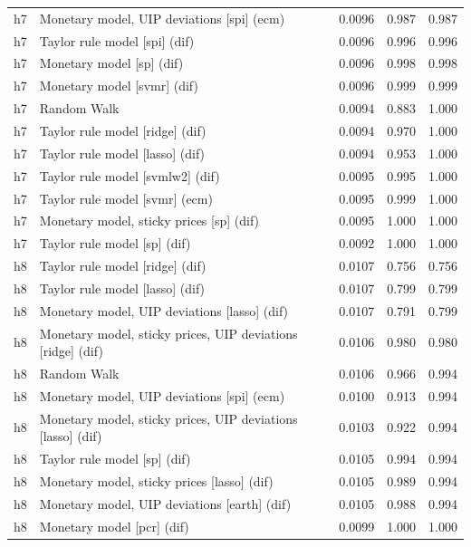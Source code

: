 \begin{ThreePartTable}
\begin{longtable}[t]{cp{5.5cm}ccc}
\addlinespace
h7 & \raggedright Monetary model, UIP deviations [spi] (ecm) & 0.0096 & 0.987 & 0.987\\
h7 & \raggedright Taylor rule model [spi] (dif) & 0.0096 & 0.996 & 0.996\\
h7 & \raggedright Monetary model [sp] (dif) & 0.0096 & 0.998 & 0.998\\
h7 & \raggedright Monetary model [svmr] (dif) & 0.0096 & 0.999 & 0.999\\
h7 & \raggedright Random Walk & 0.0094 & 0.883 & 1.000\\
h7 & \raggedright Taylor rule model [ridge] (dif) & 0.0094 & 0.970 & 1.000\\
h7 & \raggedright Taylor rule model [lasso] (dif) & 0.0094 & 0.953 & 1.000\\
h7 & \raggedright Taylor rule model [svmlw2] (dif) & 0.0095 & 0.995 & 1.000\\
h7 & \raggedright Taylor rule model [svmr] (ecm) & 0.0095 & 0.999 & 1.000\\
h7 & \raggedright Monetary model, sticky prices [sp] (dif) & 0.0095 & 1.000 & 1.000\\
h7 & \raggedright Taylor rule model [sp] (dif) & 0.0092 & 1.000 & 1.000\\
\addlinespace
h8 & \raggedright Taylor rule model [ridge] (dif) & 0.0107 & 0.756 & 0.756\\
h8 & \raggedright Taylor rule model [lasso] (dif) & 0.0107 & 0.799 & 0.799\\
h8 & \raggedright Monetary model, UIP deviations [lasso] (dif) & 0.0107 & 0.791 & 0.799\\
h8 & \raggedright Monetary model, sticky prices, UIP deviations [ridge] (dif) & 0.0106 & 0.980 & 0.980\\
h8 & \raggedright Random Walk & 0.0106 & 0.966 & 0.994\\
h8 & \raggedright Monetary model, UIP deviations [spi] (ecm) & 0.0100 & 0.913 & 0.994\\
h8 & \raggedright Monetary model, sticky prices, UIP deviations [lasso] (dif) & 0.0103 & 0.922 & 0.994\\
h8 & \raggedright Taylor rule model [sp] (dif) & 0.0105 & 0.994 & 0.994\\
h8 & \raggedright Monetary model, sticky prices [lasso] (dif) & 0.0105 & 0.989 & 0.994\\
h8 & \raggedright Monetary model, UIP deviations [earth] (dif) & 0.0105 & 0.988 & 0.994\\
h8 & \raggedright Monetary model [pcr] (dif) & 0.0099 & 1.000 & 1.000\\

\end{longtable}
\end{ThreePartTable}
